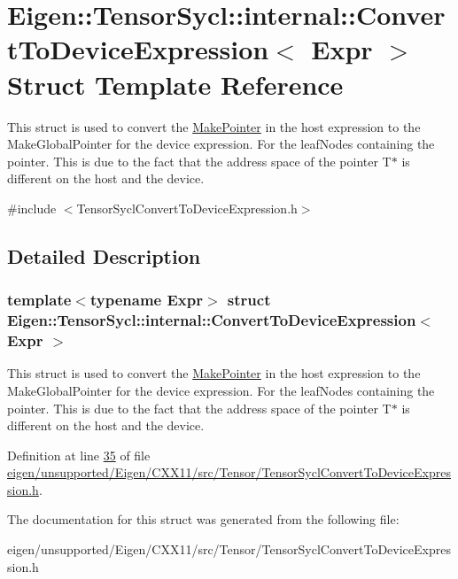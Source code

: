 \hypertarget{struct_eigen_1_1_tensor_sycl_1_1internal_1_1_convert_to_device_expression}{}\section{Eigen\+:\+:Tensor\+Sycl\+:\+:internal\+:\+:Convert\+To\+Device\+Expression$<$ Expr $>$ Struct Template Reference}
\label{struct_eigen_1_1_tensor_sycl_1_1internal_1_1_convert_to_device_expression}


This struct is used to convert the \hyperlink{struct_eigen_1_1_make_pointer}{Make\+Pointer} in the host expression to the Make\+Global\+Pointer for the device expression. For the leaf\+Nodes containing the pointer. This is due to the fact that the address space of the pointer T$\ast$ is different on the host and the device.  




{\ttfamily \#include $<$Tensor\+Sycl\+Convert\+To\+Device\+Expression.\+h$>$}



\subsection{Detailed Description}
\subsubsection*{template$<$typename Expr$>$\newline
struct Eigen\+::\+Tensor\+Sycl\+::internal\+::\+Convert\+To\+Device\+Expression$<$ Expr $>$}

This struct is used to convert the \hyperlink{struct_eigen_1_1_make_pointer}{Make\+Pointer} in the host expression to the Make\+Global\+Pointer for the device expression. For the leaf\+Nodes containing the pointer. This is due to the fact that the address space of the pointer T$\ast$ is different on the host and the device. 

Definition at line \hyperlink{eigen_2unsupported_2_eigen_2_c_x_x11_2src_2_tensor_2_tensor_sycl_convert_to_device_expression_8h_source_l00035}{35} of file \hyperlink{eigen_2unsupported_2_eigen_2_c_x_x11_2src_2_tensor_2_tensor_sycl_convert_to_device_expression_8h_source}{eigen/unsupported/\+Eigen/\+C\+X\+X11/src/\+Tensor/\+Tensor\+Sycl\+Convert\+To\+Device\+Expression.\+h}.



The documentation for this struct was generated from the following file\+:\begin{DoxyCompactItemize}
\item 
eigen/unsupported/\+Eigen/\+C\+X\+X11/src/\+Tensor/\+Tensor\+Sycl\+Convert\+To\+Device\+Expression.\+h\end{DoxyCompactItemize}
